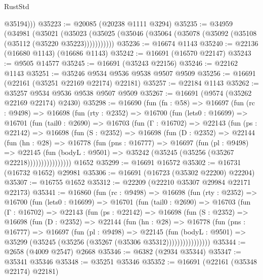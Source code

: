 \begin{lexlean}{RustStd}
\begin{coremodule}
          @35194)))
@35223 := @20085 (@20238 @1111 @3294)
@35235 := @34959
    (@34981
      (@35021
        (@35023 (@35025 (@35046 (@35064 (@35078 (@35092 (@35108 (@35112 (@35220 @35223)))))))))))
@35236 := @16674 @1143
@35240 := @22136 (@16680 @1143) (@16686 @1143)
@35242 := @16691 (@16570 @22147)
@35243 := @9505 @14577
@35245 := @16691 (@35243 @22156)
@35246 := @22162 @1143
@35251 := @35246 @9534 @9536 @9538 @9507 @9509
@35256 := @16691 (@22161 (@35251 @22169 @22174) @22181)
@35257 := @22184 @1143
@35262 := @35257 @9534 @9536 @9538 @9507 @9509
@35267 := @16691 (@9574 (@35262 @22169 @22174) @2430)
@35298 := @16690
    (fun (fn : @58) =>
    @16697
      (fun (rc : @9498) =>
      @16698
        (fun (rty : @2352) =>
        @16700
          (fun (lets0 : @16699) =>
          @16701
            (fun (tail0 : @2690) =>
            @16703
              (fun (Γ : @16702) =>
              @22143
                (fun (ps : @22142) =>
                @16698
                  (fun (S : @2352) =>
                  @16698
                    (fun (D : @2352) =>
                    @22144
                      (fun (hn : @28) =>
                      @16778
                        (fun (pns : @16777) =>
                        @16697
                          (fun (pl : @9498) =>
                          @22145
                            (fun (bodyL : @9501) =>
                            @35242 (@35245 (@35256 (@35267 @22218))))))))))))))))
    @1652
@35299 := @16691 @16572
@35302 := @16731 (@16732 @1652) @29981
@35306 := @16691 (@16723 (@35302 @22200) @22204)
@35307 := @16755 @1652
@35312 := @22209 (@22210 @35307 @29984 @22171 @22173)
@35341 := @16860
    (fun (rc : @9498) =>
    @16698
      (fun (rty : @2352) =>
      @16700
        (fun (lets0 : @16699) =>
        @16701
          (fun (tail0 : @2690) =>
          @16703
            (fun (Γ : @16702) =>
            @22143
              (fun (ps : @22142) =>
              @16698
                (fun (S : @2352) =>
                @16698
                  (fun (D : @2352) =>
                  @22144
                    (fun (hn : @28) =>
                    @16778
                      (fun (pns : @16777) =>
                      @16697
                        (fun (pl : @9498) =>
                        @22145
                          (fun (bodyL : @9501) =>
                          @35299 (@35245 (@35256 (@35267 (@35306 @35312))))))))))))))))
@35344 := @2658 (@4009 @2547) @2668
@35346 := @6382 (@2934 @35344)
@35347 := @35341 @35346
@35348 := @35251 @35346
@35352 := @16691 (@22161 (@35348 @22174) @22181)

\end{coremodule}
\end{lexlean}
